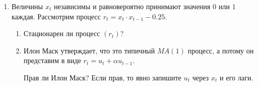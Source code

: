 \documentclass[12pt]{article}
\begin{document}
\begin{enumerate}
\item Величины $x_t$ независимы и равновероятно принимают значения $0$ или $1$ каждая. 
Рассмотрим процесс $r_t = x_t \cdot x_{t-1} - 0.25$.
\begin{enumerate}
	\item Стационарен ли процесс $(r_t)$?
	\item Илон Маск утверждает, что это типичный $MA(1)$ процесс, а потому он представим в виде $r_t = u_t + \alpha u_{t-1}$.
	
	Прав ли Илон Маск? Если прав, то явно запишите $u_t$ через $x_t$ и его лаги. 
\end{enumerate}


\end{enumerate}
\end{document}
